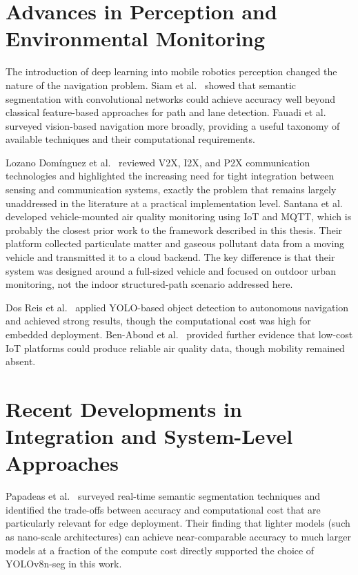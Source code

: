 \section{Advances in Perception and Environmental Monitoring}

The introduction of deep learning into mobile robotics perception
changed the nature of the navigation problem. Siam et al.\ \cite{r12}
showed that semantic segmentation with convolutional networks could
achieve accuracy well beyond classical feature-based approaches for
path and lane detection. Fauadi et al.\ \cite{r21} surveyed
vision-based navigation more broadly, providing a useful taxonomy of
available techniques and their computational requirements.

Lozano Dom\'{i}nguez et al.\ \cite{r22} reviewed V2X, I2X, and P2X
communication technologies and highlighted the increasing need for
tight integration between sensing and communication systems, exactly
the problem that remains largely unaddressed in the literature at
a practical implementation level. Santana et al.\ \cite{r23} developed
vehicle-mounted air quality monitoring using IoT and MQTT, which is
probably the closest prior work to the framework described in this
thesis. Their platform collected particulate matter and gaseous
pollutant data from a moving vehicle and transmitted it to a cloud
backend. The key difference is that their system was designed around
a full-sized vehicle and focused on outdoor urban monitoring, not
the indoor structured-path scenario addressed here.

Dos Reis et al.\ \cite{r13} applied YOLO-based object detection to
autonomous navigation and achieved strong results, though the
computational cost was high for embedded deployment. Ben-Aboud et al.\
\cite{r2} provided further evidence that low-cost IoT platforms could
produce reliable air quality data, though mobility remained absent.

\section{Recent Developments in Integration and System-Level Approaches}

Papadeas et al.\ \cite{r24} surveyed real-time semantic segmentation
techniques and identified the trade-offs between accuracy and
computational cost that are particularly relevant for edge deployment.
Their finding that lighter models (such as nano-scale architectures)
can achieve near-comparable accuracy to much larger models at a
fraction of the compute cost directly supported the choice of
YOLOv8n-seg in this work.

